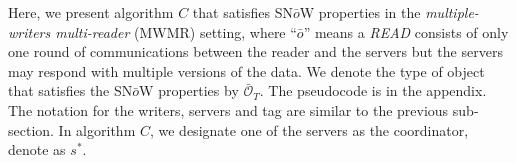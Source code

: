 Here, we present  algorithm  $C$ that satisfies  SN$\bar{o}$W  properties in the   \emph{multiple-writers multi-reader} (MWMR) setting, where ``$\bar{o}$'' means a \textit{READ} consists of 
only one round of communications between the reader and the servers but the servers may respond with multiple versions of the data. We denote the type of object that satisfies the SN$\bar{o}$W properties by $\bar{\mathcal{O}}_T$.   
The pseudocode is in the appendix. The notation for the  writers, servers and tag are similar to the previous sub-section. 
%
In algorithm $C$, we designate one of the servers as the coordinator,  denote as $s^*$. 

